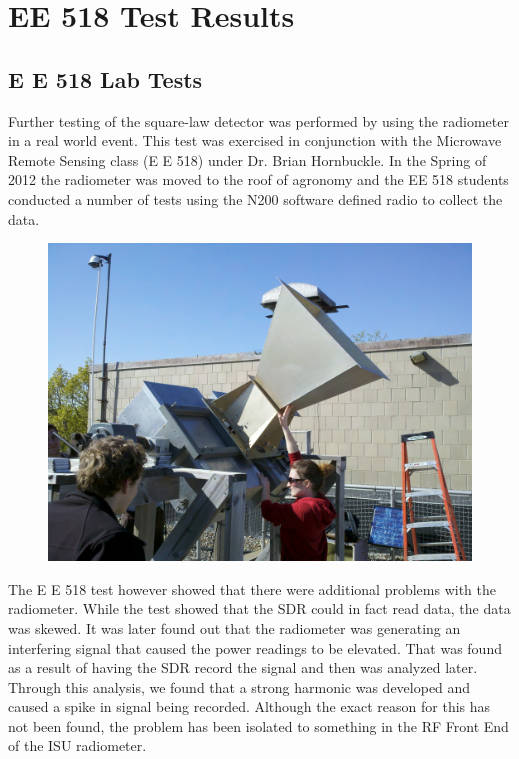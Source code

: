 \chapter{EE 518 Test Results}

\section*{E E 518 Lab Tests}

Further testing of the square-law detector was performed by using the radiometer in a real world event.  This test was exercised in conjunction with the Microwave Remote Sensing class (E E 518) under Dr. Brian Hornbuckle.  In the Spring of 2012 the radiometer was moved to the roof of agronomy and the EE 518 students conducted a number of tests using the N200 software defined radio to collect the data.


{\begin{figure}[h!tb] 
\centering
\includegraphics[width=\textwidth]{Images/radiometer_roof.jpg}
\label{radiometer_roof}
\end{figure}
}

The E E 518 test however showed that there were additional problems with the radiometer.  While the test showed that the SDR could in fact read data, the data was skewed.  It was later found out that the radiometer was generating an interfering signal that caused the power readings to be elevated.  That was found as a result of having the SDR record the signal and then was analyzed later.  Through this analysis, we found that a strong harmonic was developed and caused a spike in signal being recorded.  Although the exact reason for this has not been found, the problem has been isolated to something in the RF Front End of the ISU radiometer. 

